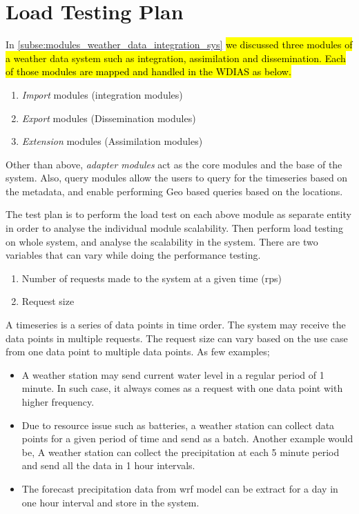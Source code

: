 \section{Load Testing Plan}
\label{se:test_plan}

In \cref{subse:modules_weather_data_integration_sys} \hl{we discussed three modules of a weather data system such as integration, assimilation and dissemination. Each of those modules are mapped and handled in the WDIAS as below.}
\begin{enumerate}
    \item \emph{Import} modules (integration modules)
    \item \emph{Export} modules (Dissemination modules)
    \item \emph{Extension} modules (Assimilation modules)
\end{enumerate}
Other than above, \emph{adapter modules} act as the core modules and the base of the system. Also, query modules allow the users to query for the timeseries based on the metadata, and enable performing Geo based queries based on the locations.

The test plan is to perform the load test on each above module as separate entity in order to analyse the individual module scalability.
Then perform load testing on whole system, and analyse the scalability in the system. There are two variables that can vary while doing the performance testing.
\begin{enumerate}
    \item Number of requests made to the system at a given time (\acrfull{rps})
    \item Request size
\end{enumerate}
A timeseries is a series of data points in time order. The system may receive the data points in multiple requests.
The request size can vary based on the use case from one data point to multiple data points. As few examples;
\begin{itemize}
    \item A weather station may send current water level in a regular period of 1 minute. In such case, it always comes as a request with one data point with higher frequency.
    \item Due to resource issue such as batteries, a weather station can collect data points for a given period of time and send as a batch. Another example would be,
A weather station can collect the precipitation at each 5 minute period and send all the data in 1 hour intervals.
    \item The forecast precipitation data from \acrshort{wrf} model can be extract for a day in one hour interval and store in the system.
\end{itemize}

